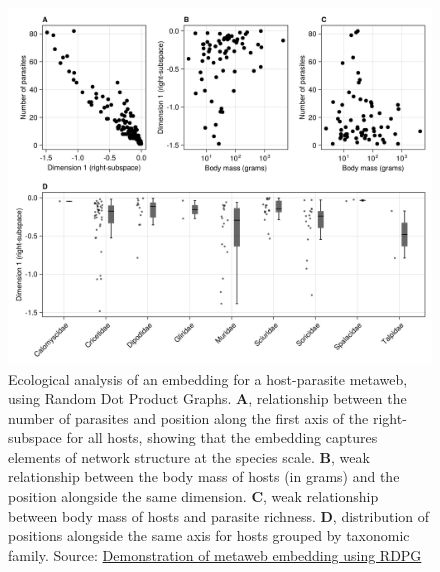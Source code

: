 \documentclass[
  letterpaper,
  DIV=11,
  numbers=noendperiod]{scrartcl}
\begin{document}
\begin{figure}[H]

{\centering \includegraphics{index_files/figure-latex/fig-illustration-2-output-1.png}

}

\caption{\label{fig-illustration-2}Ecological analysis of an embedding
for a host-parasite metaweb, using Random Dot Product Graphs.
\textbf{A}, relationship between the number of parasites and position
along the first axis of the right-subspace for all hosts, showing that
the embedding captures elements of network structure at the species
scale. \textbf{B}, weak relationship between the body mass of hosts (in
grams) and the position alongside the same dimension. \textbf{C}, weak
relationship between body mass of hosts and parasite richness.
\textbf{D}, distribution of positions alongside the same axis for hosts
grouped by taxonomic family. Source:
\href{https://PoisotLab.github.io/ms_metaweb_perspectives/notebooks/SupplementaryMaterial-preview.html\#cell-fig-illustration-2}{Demonstration
of metaweb embedding using RDPG}}

\end{figure}
\end{document}

